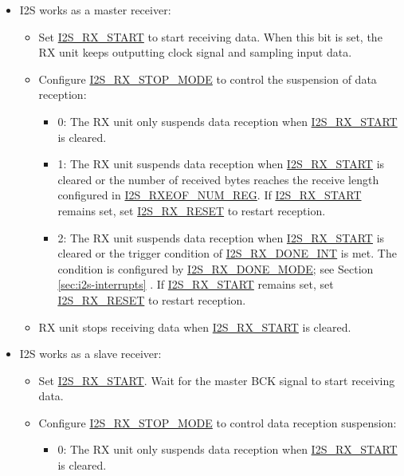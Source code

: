\documentclass[main\_\_EN.tex]{subfiles}
\begin{document}
\begin{itemize}
    \item I2S works as a master receiver:
    \begin{itemize}
        \item Set \hyperref[fielddesc:I2SRXSTART]{I2S\_RX\_START} to start receiving data. When this bit is set, the RX unit keeps outputting clock signal and sampling input data.
        \item Configure \hyperref[fielddesc:I2SRXSTOPMODE]{I2S\_RX\_STOP\_MODE} to control the suspension of data reception:
        \begin{itemize}
            \item 0: The RX unit only suspends data reception when \hyperref[fielddesc:I2SRXSTART]{I2S\_RX\_START} is cleared.
            \item 1: The RX unit suspends data reception when \hyperref[fielddesc:I2SRXSTART]{I2S\_RX\_START} is cleared or the number of received bytes reaches the receive length configured in \hyperref[regdesc:I2SRXEOFNUMREG]{I2S\_RXEOF\_NUM\_REG}. If \hyperref[fielddesc:I2SRXSTART]{I2S\_RX\_START} remains set, set \hyperref[fielddesc:I2SRXRESET]{I2S\_RX\_RESET} to restart reception.
            \item 2: The RX unit suspends data reception when \hyperref[fielddesc:I2SRXSTART]{I2S\_RX\_START} is cleared or the trigger condition of \hyperref[int:I2SRXDONEINT]{I2S\_RX\_DONE\_INT} is met. The condition is configured by \hyperref[fielddesc:I2SRXDONEMODE]{I2S\_RX\_DONE\_MODE}; see Section \ref{sec:i2s-interrupts} \textit{}. If \hyperref[fielddesc:I2SRXSTART]{I2S\_RX\_START} remains set, set \hyperref[fielddesc:I2SRXRESET]{I2S\_RX\_RESET} to restart reception.
        \end{itemize}
        \item RX unit stops receiving data when \hyperref[fielddesc:I2SRXSTART]{I2S\_RX\_START} is cleared.
    \end{itemize}
    \item I2S works as a slave receiver:
    \begin{itemize}
        \item Set \hyperref[fielddesc:I2SRXSTART]{I2S\_RX\_START}. Wait for the master BCK signal to start receiving data.
        \item Configure \hyperref[fielddesc:I2SRXSTOPMODE]{I2S\_RX\_STOP\_MODE} to control data reception suspension:
        \begin{itemize}
            \item 0: The RX unit only suspends data reception when \hyperref[fielddesc:I2SRXSTART]{I2S\_RX\_START} is cleared.

\end{itemize}
\end{itemize}
\end{itemize}
\end{document}
